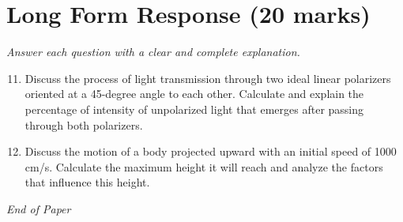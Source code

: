 \documentclass[12pt]{article}
\begin{document}
\section*{Long Form Response (20 marks)}
\textit{Answer each question with a clear and complete explanation.}
\begin{enumerate}[label=\arabic*.]
\setcounter{enumi}{10}
\item Discuss the process of light transmission through two ideal linear polarizers oriented at a 45-degree angle to each other. Calculate and explain the percentage of intensity of unpolarized light that emerges after passing through both polarizers.
\item Discuss the motion of a body projected upward with an initial speed of 1000 cm/s. Calculate the maximum height it will reach and analyze the factors that influence this height.
\end{enumerate}

\vfill
\noindent\textit{End of Paper}
\end{document}
